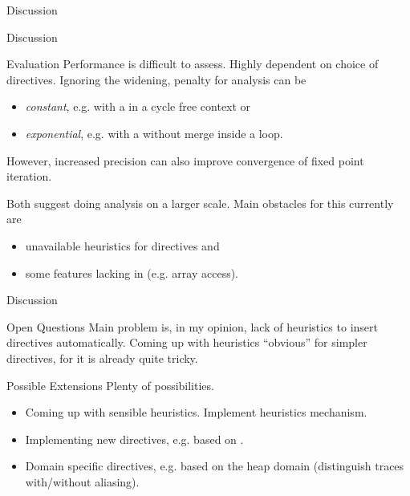 \documentclass{beamer}
\begin{document}
\begin{section}{Discussion}


	\begin{frame}[t]{Discussion}
		\begin{block}{Evaluation}
			Performance is difficult to assess. Highly dependent on choice of directives. Ignoring the widening, penalty for analysis can be
			\begin{itemize}
				\item \emph{constant}, e.g. with a  in a cycle free context or
				\item \emph{exponential}, e.g. with a  without merge inside a loop.
			\end{itemize}
			However, increased precision can also improve convergence of fixed point iteration.

			Both suggest doing analysis on a larger scale. Main obstacles for this currently are
			\begin{itemize}
				\item unavailable heuristics for directives and
				\item some features lacking in \sample (e.g. array access).
			\end{itemize}
		\end{block}
	\end{frame}


	\begin{frame}[t]{Discussion}
		\begin{block}{Open Questions}
			Main problem is, in my opinion, lack of heuristics to insert directives automatically. Coming up with heuristics ``obvious'' for simpler directives, for  it is already quite tricky.
		\end{block}

		\begin{block}{Possible Extensions}
			Plenty of possibilities.
			\begin{itemize}
				\item Coming up with sensible heuristics. Implement heuristics mechanism.
				\item Implementing new directives, e.g. based on .
				\item Domain specific directives, e.g. based on the heap domain (distinguish traces with/without aliasing). 
			\end{itemize}
		\end{block}
	\end{frame}


\end{section}
\end{document}
